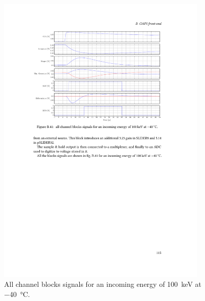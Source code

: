 \begin{figure}[h!]
    \centering
    \includegraphics[width=0.9\textwidth]{Images/appendGAPSintro/ASIC_riassunto_segnali.pdf}
    \caption{All channel blocks signals for an incoming energy of \SI{100}{\kilo\electronvolt} at \SI{-40}{\celsius}.}
    \label{figASICsignals}
\end{figure}
